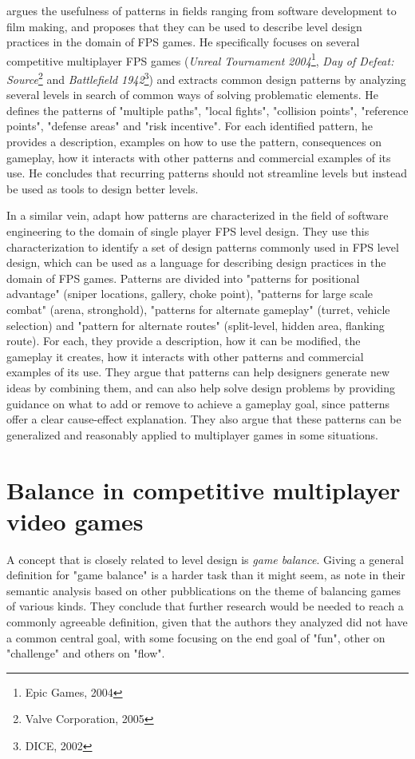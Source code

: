 \documentclass{Configuration_Files/PoliMi3i_thesis}
\begin{document}
 argues the usefulness of patterns in fields ranging from software development to film making, and proposes that they can be used to describe level design practices in the domain of FPS games. He specifically focuses on several competitive multiplayer FPS games (\textit{Unreal Tournament 2004}\footnote{Epic Games, 2004}, \textit{Day of Defeat: Source}\footnote{Valve Corporation, 2005} and \textit{Battlefield 1942}\footnote{DICE, 2002}) and extracts common design patterns by analyzing several levels in search of common ways of solving problematic elements. He defines the patterns of "multiple paths", "local fights", "collision points", "reference points", "defense areas" and "risk incentive". For each identified pattern, he provides a description, examples on how to use the pattern, consequences on gameplay, how it interacts with other patterns and commercial examples of its use. He concludes that recurring patterns should not streamline levels but instead be used as tools to design better levels. \cite{larsen_level_2006}

In a similar vein,  adapt how patterns are characterized in the field of software engineering to the domain of single player FPS level design. They use this characterization to identify a set of design patterns commonly used in FPS level design, which can be used as a language for describing design practices in the domain of FPS games. Patterns are divided into "patterns for positional advantage" (sniper locations, gallery, choke point), "patterns for large scale combat" (arena, stronghold), "patterns for alternate gameplay" (turret, vehicle selection) and "pattern for alternate routes" (split-level, hidden area, flanking route). For each, they provide a description, how it can be modified, the gameplay it creates, how it interacts with other patterns and commercial examples of its use. 
They argue that patterns can help designers generate new ideas by combining them, and can also help solve design problems by providing guidance on what to add or remove to achieve a gameplay goal, since patterns offer a clear cause-effect explanation. They also argue that these patterns can be generalized and reasonably applied to multiplayer games in some situations. \cite{hullett_design_2010}

\section{Balance in competitive multiplayer video games}
\label{sec:balance}
A concept that is closely related to level design is \textit{game balance}. Giving a general definition for "game balance" is a harder task than it might seem, as \citeauthor{becker_what_2020} note in their semantic analysis based on other pubblications on the theme of balancing games of various kinds. They conclude that further research would be needed to reach a commonly agreeable definition, given that the authors they analyzed did not have a common central goal, with some focusing on the end goal of "fun", other on "challenge" and others on "flow". \cite{becker_what_2020}
\end{document}
